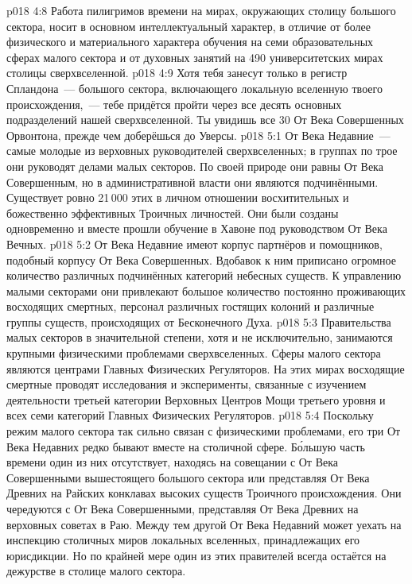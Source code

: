 \vs p018 4:8 Работа пилигримов времени на мирах, окружающих столицу большого сектора, носит в основном интеллектуальный характер, в отличие от более физического и материального характера обучения на семи образовательных сферах малого сектора и от духовных занятий на 490 университетских мирах столицы сверхвселенной.
\vs p018 4:9 Хотя тебя занесут только в регистр Спландона~--- большого сектора, включающего локальную вселенную твоего происхождения,~--- тебе придётся пройти через все десять основных подразделений нашей сверхвселенной. Ты увидишь все 30 От Века Совершенных Орвонтона, прежде чем доберёшься до Уверсы.
\vs p018 5:1 От Века Недавние~--- самые молодые из верховных руководителей сверхвселенных; в группах по трое они руководят делами малых секторов. По своей природе они равны От Века Совершенным, но в административной власти они являются подчинёнными. Существует ровно 21\,000 этих в личном отношении восхитительных и божественно эффективных Троичных личностей. Они были созданы одновременно и вместе прошли обучение в Хавоне под руководством От Века Вечных.
\vs p018 5:2 От Века Недавние имеют корпус партнёров и помощников, подобный корпусу От Века Совершенных. Вдобавок к ним приписано огромное количество различных подчинённых категорий небесных существ. К управлению малыми секторами они привлекают большое количество постоянно проживающих восходящих смертных, персонал различных гостящих колоний и различные группы существ, происходящих от Бесконечного Духа.
\vs p018 5:3 Правительства малых секторов в значительной степени, хотя и не исключительно, занимаются крупными физическими проблемами сверхвселенных. Сферы малого сектора являются центрами Главных Физических Регуляторов. На этих мирах восходящие смертные проводят исследования и эксперименты, связанные с изучением деятельности третьей категории Верховных Центров Мощи третьего уровня и всех семи категорий Главных Физических Регуляторов.
\vs p018 5:4 Поскольку режим малого сектора так сильно связан с физическими проблемами, его три От Века Недавних редко бывают вместе на столичной сфере. Б\'ольшую часть времени один из них отсутствует, находясь на совещании с От Века Совершенными вышестоящего большого сектора или представляя От Века Древних на Райских конклавах высоких существ Троичного происхождения. Они чередуются с От Века Совершенными, представляя От Века Древних на верховных советах в Раю. Между тем другой От Века Недавний может уехать на инспекцию столичных миров локальных вселенных, принадлежащих его юрисдикции. Но по крайней мере один из этих правителей всегда остаётся на дежурстве в столице малого сектора.
